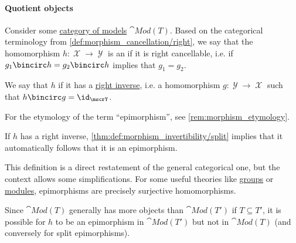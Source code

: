 \paragraph{Quotient objects}

\begin{definition}\label{def:fol_epimorphism}\mimprovised
  Consider some \hyperref[def:fol_theory_model_functor/obj]{category of models} \( \cat{Mod}(T) \). Based on the categorical terminology from \cref{def:morphism_cancellation/right}, we say that the homomorphism \( h: \mscrX \to \mscrY \) is an  if it is right cancellable, i.e. if \( g_1 \bincirc h = g_2 \bincirc h \) implies that \( g_1 = g_2 \).

  We say that \( h \)  if it has a \hyperref[def:morphism_invertibility/right]{right inverse}, i.e. a homomorphism \( g: \mscrY \to \mscrX \) such that \( h \bincirc g = \id_\mscrY \).
\end{definition}
\begin{comments}
  \item For the etymology of the term \enquote{epimorphism}, see \cref{rem:morphism_etymology}.
\end{comments}
\begin{comments}
  \item If \( h \) has a right inverse, \cref{thm:def:morphism_invertibility/split} implies that it automatically follows that it is an epimorphism.

  \item This definition is a direct restatement of the general categorical one, but the context allows some simplifications. For some useful theories like \hyperref[def:group]{groups} or \hyperref[def:module]{modules}, epimorphisms are precisely surjective homomorphisms.

  \item Since \( \cat{Mod}(T) \) generally has more objects than \( \cat{Mod}(T') \) if \( T \subseteq T' \), it is possible for \( h \) to be an epimorphism in \( \cat{Mod}(T') \) but not in \( \cat{Mod}(T) \) (and conversely for split epimorphisms).
\end{comments}

